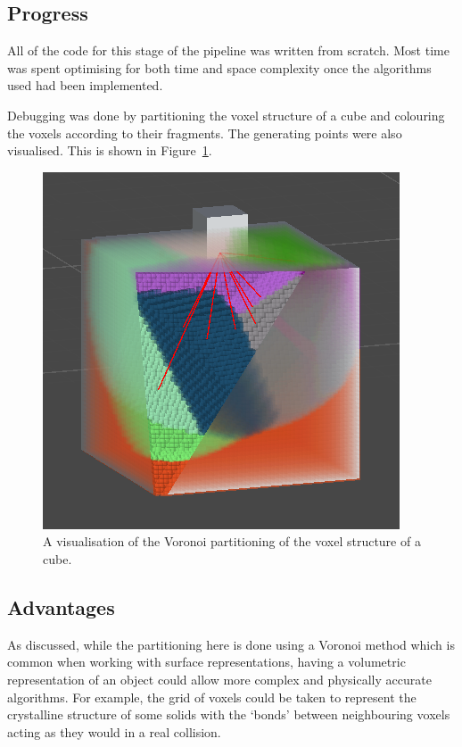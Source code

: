 \subsection{Progress}

All of the code for this stage of the pipeline was written from scratch. Most time was spent optimising for both time and space complexity once the algorithms used had been implemented.

Debugging was done by partitioning the voxel structure of a cube and colouring the voxels according to their fragments. The generating points were also visualised. This is shown in Figure~\ref{fig:3.6}.

\begin{figure}[b!]
\centerline{\includegraphics[scale=1]{Voronoi.png}}
\caption{A visualisation of the Voronoi partitioning of the voxel structure of a cube.}
\label{fig:3.6}
\end{figure}

\subsection{Advantages}

As discussed, while the partitioning here is done using a Voronoi method which is common when working with surface representations, having a volumetric representation of an object could allow more complex and physically accurate algorithms. For example, the grid of voxels could be taken to represent the crystalline structure of some solids with the `bonds' between neighbouring voxels acting as they would in a real collision.

